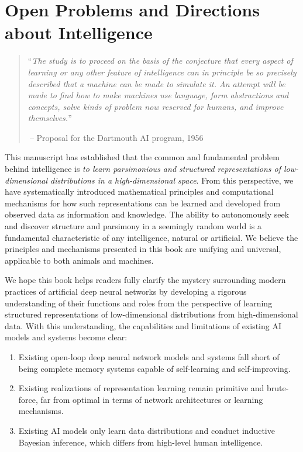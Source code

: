 \documentclass[../../book-main.tex]{subfiles}
\begin{document}
\chapter{Open Problems and Directions about Intelligence}
\label{ch:future}

\begin{quote}
    ``\textit{The study is to proceed on the basis of the conjecture
        that every aspect of learning or any other feature of
        intelligence can in principle be so precisely described that a
        machine can be made to simulate it. An attempt will be made to
        find how to make machines use language, form abstractions and
        concepts, solve kinds of problem now reserved for humans, and
    improve themselves.}''

    $~$\hfill -- Proposal for the Dartmouth AI program, 1956
\end{quote}
\vspace{5mm}

This manuscript has established that the common and fundamental problem behind
intelligence is {\em to learn parsimonious and structured representations of 
low-dimensional distributions in a high-dimensional space}. From this perspective, 
we have systematically introduced mathematical principles and
computational mechanisms for how such representations can be learned and 
developed from observed data as information and knowledge. 
The ability to autonomously seek and discover structure and parsimony in 
a seemingly random world is a fundamental characteristic of any
intelligence, natural or artificial. We believe the principles and
mechanisms presented in this book are unifying and universal, 
applicable to both animals and machines.

We hope this book helps readers fully clarify the mystery surrounding
modern practices of artificial deep neural networks by developing a
rigorous understanding of their functions and roles from the perspective
of learning structured representations of low-dimensional distributions 
from high-dimensional data. With this understanding, the capabilities 
and limitations of existing AI models and systems become clear:
\begin{enumerate}
    \item Existing open-loop deep neural network models and systems fall short of being complete memory systems capable 
    of self-learning and self-improving.
    \item Existing realizations of representation learning remain primitive and brute-force, 
    far from optimal in terms of network architectures or learning mechanisms.
    \item Existing AI models only learn data distributions and
    conduct inductive Bayesian inference, which differs from high-level human intelligence.
\end{enumerate}
\end{document}
